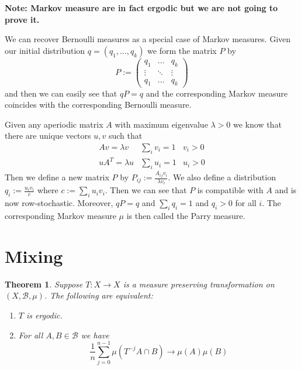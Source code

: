 \documentclass[11pt]{article}
\newcommand{\defeq}{:=}
\newcommand{\mdf}[1]{{\color{red} #1}}
\newenvironment{note}
	{\begin{mdframed}[backgroundcolor=white, linecolor=red, roundcorner=5pt, linewidth=1pt]\bfseries{Note:}\normalfont}
	{\end{mdframed}}
\newtheorem{theorem}[prop]{Theorem}
\begin{document}
\begin{note}
Markov measure are in fact ergodic but we are not going to prove it.
\end{note}

We can recover Bernoulli measures as a special case of Markov measures.
Given our initial distribution $q=(q_1, \dots, q_k)$ we form the matrix $P$ by
\[
P\defeq
\begin{pmatrix}
	q_1 & \dots & q_k \\
	\vdots & \ddots & \vdots \\
	q_1 & \dots & q_k
\end{pmatrix}
\]
and then we can easily see that $qP=q$ and the corresponding Markov measure coincides with the corresponding Bernoulli measure.

Given any aperiodic matrix $A$ with maximum eigenvalue $\lambda>0$ we know that there are unique vectors $u, v$ such that
\begin{align*}
	Av = \lambda v &\sum_{i}v_i=1 & v_i > 0 \\
	uA^T = \lambda u & \sum_{i}u_i =1 & u_i >0
\end{align*}
Then we define a new matrix $P$ by $P_{ij}\defeq\frac{A_{ij} v_i}{\lambda v_i}$.
We also define a distribution $q_i\defeq\frac{u_i v_i}{c}$ where $c\defeq \sum_{i}u_i v_i$.
Then we can see that $P$ is compatible with $A$ and is now row-stochastic.
Moreover, $qP=q$ and $\sum_{i}q_i = 1$ and $q_i>0$ for all $i$.
The corresponding Markov measure $\mu$ is then called the \mdf{Parry measure}.

\section{Mixing}
\begin{theorem}
Suppose $T:X \to X$ is a measure preserving transformation on $(X,\mathcal{B}, \mu)$.
The following are equivalent:
\begin{enumerate}[label=(\alph*)]
	\item $T$ is ergodic.
	\item For all $A,B\in\mathcal{B}$ we have
		\[
			\frac{1}{n}\sum_{j=0}^{n-1}\mu(T^{-j}A\cap B) \to \mu(A)\mu(B)
		\]
\end{enumerate}
\end{theorem}
\end{document}

